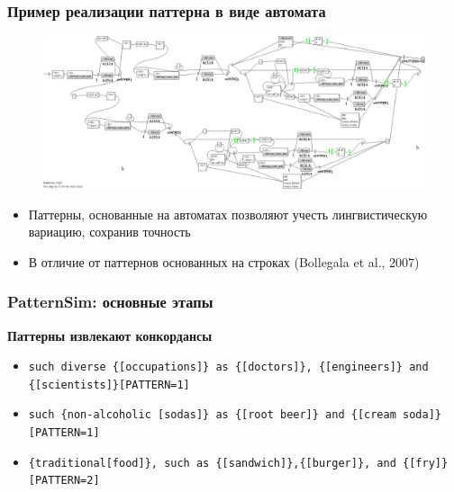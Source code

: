 \begin{frame}
\frametitle{Пример реализации паттерна в виде автомата}

\begin{figure}  
    \centering
        \includegraphics[width=1.0\textwidth]{figures/pattern2}
    \end{figure}

\begin{itemize}
  \item Паттерны, основанные на автоматах позволяют учесть лингвистическую вариацию, сохранив
  точность
      \item В отличие от паттернов основанных на строках (Bollegala et al., 2007)
    
\end{itemize}

\end{frame}






\begin{frame}
\frametitle{PatternSim: основные этапы}


\textbf{Паттерны извлекают конкордансы}

\begin{itemize}
  \item \texttt{such diverse \{[occupations]\} as
  \{[doctors]\}, \{[engineers]\} and \{[scientists]\}[PATTERN=1]}
  \item \texttt{such \{non-alcoholic [sodas]\} as \{[root beer]\} and \{[cream soda]\}[PATTERN=1]}
  \item \texttt{\{traditional[food]\}, such as \{[sandwich]\},\{[burger]\}, and \{[fry]\}[PATTERN=2]}
\end{itemize}

\end{frame}






